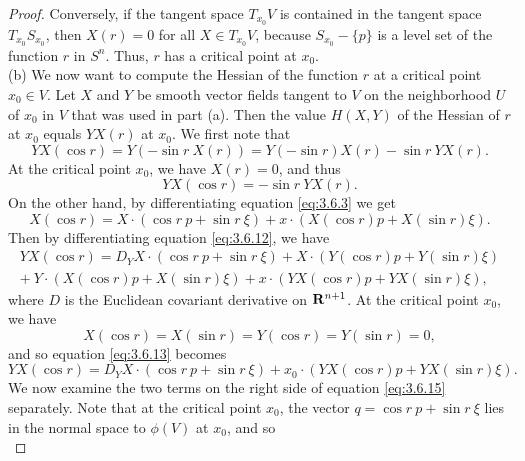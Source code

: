 \documentclass[12pt]{article}
\begin{document}
\begin{proof}
Conversely, if the tangent space $T_{x_0}V$ is contained in the tangent
space $T_{x_0}S_{x_0}$, then $X(r) = 0$ for all $X \in T_{x_0}V$, because $S_{x_0} - \{p\}$ is a level set of the function
$r$ in $S^n$. Thus, $r$ has a critical point at $x_0$.\\

\noindent 
(b) We now want to compute the 
Hessian of the function $r$ at a critical point $x_0 \in V$.  Let $X$ and $Y$ be
smooth vector fields tangent to $V$ on the neighborhood $U$ of $x_0$ in $V$ that was used in part (a).  
Then the value $H(X,Y)$ of 
the Hessian of $r$
at $x_0$ equals $YX(r)$ at $x_0$.  We first note that
\begin{equation}
\label{eq:3.6.10}
YX(\cos r) = Y(-\sin r \ X(r)) = Y(-\sin r) X(r) - \sin r \ YX(r).
\end{equation}
At the critical point $x_0$, we have $X(r) = 0$, and thus
\begin{equation}
\label{eq:3.6.11}
YX(\cos r) = - \sin r \ YX(r).
\end{equation}
On the other hand, by differentiating equation \eqref{eq:3.6.3} we get
\begin{equation}
\label{eq:3.6.12}
X(\cos r) = X \cdot (\cos r\  p + \sin r\  \xi) + x \cdot (X(\cos r) p + X(\sin r) \xi).
\end{equation}
Then by differentiating equation \eqref{eq:3.6.12}, we have
\begin{eqnarray}
\label{eq:3.6.13}
YX(\cos r) = D_Y X \cdot (\cos r\  p + \sin r\  \xi) + X \cdot (Y(\cos r) p + Y(\sin r) \xi) \\ 
 + \ Y \cdot (X(\cos r) p + X(\sin r) \xi) + x \cdot (YX(\cos r) p + YX(\sin r) \xi), \nonumber
\end{eqnarray}
where $D$ is the Euclidean covariant derivative on ${\bf R}^{n+1}$.  At the critical point $x_0$, we have
\begin{equation}
\label{eq:3.6.14}
X(\cos r) = X(\sin r) = Y(\cos r) = Y(\sin r) = 0,
\end{equation}
and so equation \eqref{eq:3.6.13} becomes
\begin{equation}
\label{eq:3.6.15}
YX(\cos r) = D_Y X \cdot (\cos r\  p + \sin r\  \xi) + x_0 \cdot (YX(\cos r) p + YX(\sin r) \xi).
\end{equation}
We now examine the two terms on the right side of equation \eqref{eq:3.6.15} separately.  Note that at the critical point
$x_0$, the vector $q = \cos r \ p + \sin r \ \xi$ lies in the normal
space to $\phi (V)$ at $x_0$, and so
\begin{equation}

\end{equation}
\end{proof}
\end{document}
